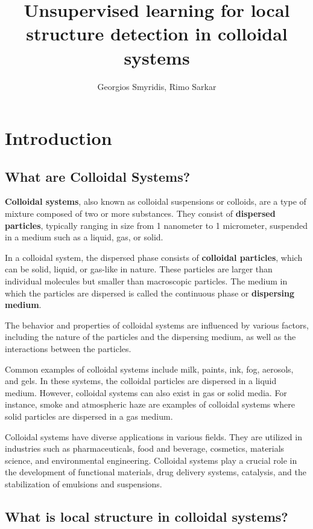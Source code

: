 \documentclass{report}
\title{Unsupervised learning for local structure detection in colloidal systems}
\author{Georgios Smyridis, Rimo Sarkar}
\date{}
\begin{document}
\maketitle


\chapter{Introduction}

\section{What are Colloidal Systems?}

\textbf{Colloidal systems}, also known as colloidal suspensions or colloids, are a type of mixture composed of two or more substances. They consist of \textbf{dispersed particles}, typically ranging in size from 1 nanometer to 1 micrometer, suspended in a medium such as a liquid, gas, or solid.

In a colloidal system, the dispersed phase consists of \textbf{colloidal particles}, which can be solid, liquid, or gas-like in nature. These particles are larger than individual molecules but smaller than macroscopic particles. The medium in which the particles are dispersed is called the continuous phase or \textbf{dispersing medium}.

The behavior and properties of colloidal systems are influenced by various factors, including the nature of the particles and the dispersing medium, as well as the interactions between the particles.

Common examples of colloidal systems include milk, paints, ink, fog, aerosols, and gels. In these systems, the colloidal particles are dispersed in a liquid medium. However, colloidal systems can also exist in gas or solid media. For instance, smoke and atmospheric haze are examples of colloidal systems where solid particles are dispersed in a gas medium.

Colloidal systems have diverse applications in various fields. They are utilized in industries such as pharmaceuticals, food and beverage, cosmetics, materials science, and environmental engineering. Colloidal systems play a crucial role in the development of functional materials, drug delivery systems, catalysis, and the stabilization of emulsions and suspensions.

\section{What is local structure in colloidal systems?}
\end{document}
